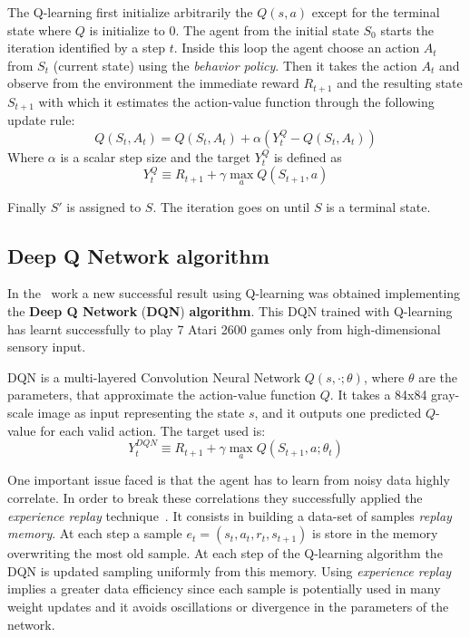 The Q-learning first initialize arbitrarily the $Q(s,a)$ except for the terminal state where $Q$ is initialize to 0.
The agent from the initial state $S_0$ starts the iteration identified by a step $t$. Inside this loop the agent choose an action $A_t$ from $S_t$ (current state) using the \textit{behavior policy}. Then it takes the action $A_t$ and observe from the environment the immediate reward $R_{t+1}$ and the resulting state $S_{t+1}$ with which it estimates the action-value function through the following update rule:
\begin{equation}
	Q(S_t, A_t) = Q(S_t, A_t) + \alpha (Y^Q_t - Q(S_t, A_t))
\end{equation}
Where $\alpha$ is a scalar step size and the target $Y^Q_t$ is defined as
\begin{equation}
	Y^Q_t \equiv R_{t+1} + \gamma \max_{a} Q(S_{t+1}, a)
\end{equation}

Finally $S'$ is assigned to $S$. The iteration goes on until $S$ is a terminal state.

\subsection{Deep Q Network algorithm}

In the~\cite{DBLP:journals/corr/MnihKSGAWR13} work a new successful result using Q-learning was obtained implementing the \textbf{Deep Q Network} (\textbf{DQN}) \textbf{algorithm}. This DQN trained with Q-learning has learnt successfully to play 7 Atari 2600 games only from high-dimensional sensory input.

DQN is a multi-layered Convolution Neural Network $Q(s, \cdotp; \theta)$, where $\theta$ are the parameters, that approximate the action-value function $Q$. It takes a 84x84 gray-scale image as input representing the state $s$, and it outputs one predicted $Q$-value for each valid action. The target used is:
\begin{equation}
Y^{DQN}_t \equiv R_{t+1} + \gamma \max_{a} Q(S_{t+1}, a; \theta_t)
\end{equation}

One important issue faced is that the agent has to learn from noisy data highly correlate. In order to break these correlations they successfully applied the \textit{experience replay} technique~\cite{Lin:1992:RLR:168871}. It consists in building a data-set of samples \textit{replay memory}. At each step a sample $e_t = (s_t, a_t, r_t, s_{t+1})$ is store in the memory overwriting the most old sample. At each step of the Q-learning algorithm the DQN is updated sampling uniformly from this memory. Using \textit{experience replay} implies a greater data efficiency since each sample is potentially used in many weight updates and it avoids oscillations or divergence in the parameters of the network.

